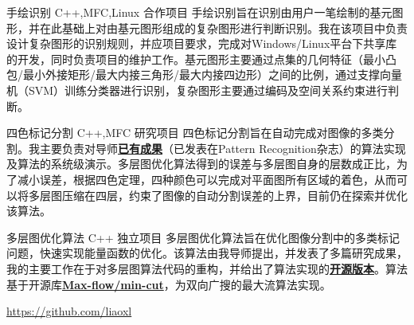 \documentclass[11pt,a4paper,sans]{moderncv}   %
\begin{document}
\begin{CJK}{UTF8}{gbsn}
{手绘识别}
{C++,MFC,Linux}
{合作项目}{}
{手绘识别旨在识别由用户一笔绘制的基元图形，并在此基础上对由基元图形组成的复杂图形进行判断识别。我在该项目中负责设计复杂图形的识别规则，并应项目要求，完成对Windows/Linux平台下共享库的开发，同时负责项目的维护工作。基元图形主要通过点集的几何特征（最小凸包/最小外接矩形/最大内接三角形/最大内接四边形）之间的比例，通过支撑向量机（SVM）训练分类器进行识别，复杂图形主要通过编码及空间关系约束进行判断。}
\vspace*{0.2\baselineskip}

{四色标记分割}
{C++,MFC}
{研究项目}{}
{四色标记分割旨在自动完成对图像的多类分割。我主要负责对导师\textbf{\href{http://www.sciencedirect.com/science/article/pii/S0031320311001907}{已有成果}}（已发表在Pattern Recognition杂志）的算法实现及算法的系统级演示。多层图优化算法得到的误差与多层图自身的层数成正比，为了减小误差，根据四色定理，四种颜色可以完成对平面图所有区域的着色，从而可以将多层图压缩在四层，约束了图像的自动分割误差的上界，目前仍在探索并优化该算法。}
\vspace*{0.2\baselineskip}

{多层图优化算法}
{C++}
{独立项目}{}
{多层图优化算法旨在优化图像分割中的多类标记问题，快速实现能量函数的优化。该算法由我导师提出，并发表了多篇研究成果，我的主要工作在于对多层图算法代码的重构，并给出了算法实现的\textbf{\href{https://github.com/liaoxl/MultiLayerGraph}{开源版本}}。算法基于开源库\textbf{\href{http://vision.csd.uwo.ca/code/}{Max-flow/min-cut}}，为双向广搜的最大流算法实现。}
\vspace*{0.2\baselineskip}

{\href{https://github.com/liaoxl}{https://github.com/liaoxl}}
{}{}{}{}

\renewcommand{\baselinestretch}{1.0}

\closesection{}                   %
\renewcommand{\listitemsymbol}{-} %
\clearpage\end{CJK}
\end{document}

